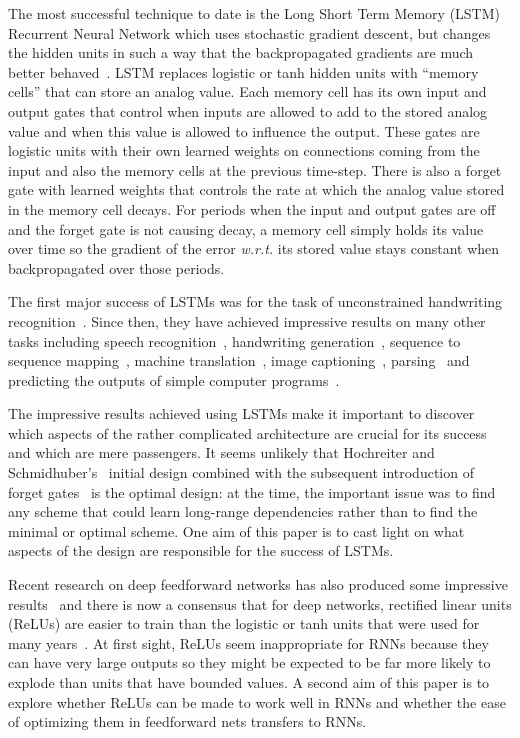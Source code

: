 \documentclass{article} \usepackage{nips14submit_e,times,graphicx}
\begin{document}
The most successful technique to date is the Long Short Term Memory
(LSTM) Recurrent Neural Network which uses stochastic gradient
descent, but changes the hidden units in such a way that the
backpropagated gradients are much better
behaved~\cite{hochreiter97}. LSTM replaces logistic or tanh hidden
units with ``memory cells'' that can store an analog value.  Each
memory cell has its own input and output gates that control when
inputs are allowed to add to the stored analog value and when this
value is allowed to influence the output. These gates are logistic
units with their own learned weights on connections coming from the
input and also the memory cells at the previous time-step. There is
also a forget gate with learned weights that controls the rate at
which the analog value stored in the memory cell decays.  For periods
when the input and output gates are off and the forget gate is not
causing decay, a memory cell simply holds its value over time so the
gradient of the error {\it w.r.t.} its stored value stays constant
when backpropagated over those periods.

The first major success of LSTMs was for the task of unconstrained
handwriting recognition~\cite{graves2009novel}. Since then, they have
achieved impressive results on many other tasks including speech
recognition~\cite{graves2013speech,graves2014towards}, handwriting
generation~\cite{graves2013generating}, sequence to sequence
mapping~\cite{sutskever14}, machine
translation~\cite{luong2014addressing,bahdanau2014neural}, image
captioning~\cite{vinyals2014show,kiros2014unifying},
parsing~\cite{vinyals2014grammar} and predicting the outputs of simple
computer programs~\cite{zaremba2014learning}.

The impressive results achieved using LSTMs make it important to
discover which aspects of the rather complicated architecture are
crucial for its success and which are mere passengers. It seems
unlikely that Hochreiter and Schmidhuber's~\cite{hochreiter97} initial
design combined with the subsequent introduction of forget
gates~\cite{gers2000learning,gers2003learning} is the optimal design:
at the time, the important issue was to find any scheme that could
learn long-range dependencies rather than to find the minimal or
optimal scheme.  One aim of this paper is to cast light on what
aspects of the design are responsible for the success of LSTMs.

Recent research on deep feedforward networks has also produced some
impressive results~\cite{kriz12, dahl12b} and there is now a consensus
that for deep networks, rectified linear units (ReLUs) are easier to
train than the logistic or tanh units that were used for many
years~\cite{nair10,zeiler2013rectified}.  At first sight, ReLUs seem
inappropriate for RNNs because they can have very large outputs so
they might be expected to be far more likely to explode than units
that have bounded values. A second aim of this paper is to explore
whether ReLUs can be made to work well in RNNs and whether the ease of
optimizing them in feedforward nets transfers to RNNs.
\end{document}
